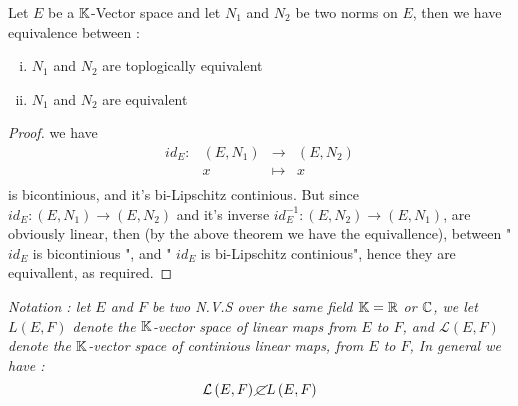 % 
% 

\lecday[2025-02-13]

% 

\begin{theorem}[]
Let $E$ be a $\mathbb{K}$-Vector space and let
$N_1$ and $N_2$ be two norms on $E$, then we have
equivalence between : 
\begin{enumerate}[(i)]
\item $N_1$ and $N_2$ are toplogically equivalent
\item $N_1$ and $N_2$ are equivalent 
\end{enumerate}
\end{theorem}
\begin{proof}
we have
\[
\begin{array}{cccc}
      id_{E} : &  \left( E,N_1 \right)  & \longrightarrow & 
      \left( E,N_2 \right)\\

           &  x  & \longmapsto     & x \\ 
\end{array}
\]
is bicontinious, and it's bi-Lipschitz continious. But
since $ id_{E} : \left( E,N_1 \right) \longrightarrow 
\left( E,N_2 \right)$ and it's inverse 
$ id_{E}^{-1} : \left( E,N_2 \right) \longrightarrow 
\left( E,N_1 \right)$, are obviously linear, then 
(by the above theorem we have the equivallence), 
between " $id_{E}$ is bicontinious ", and 
" $id_{E}$ is bi-Lipschitz continious", hence they are equivallent, 
as required.
\end{proof}
\it Notation : \normalfont let $E$ and $F$ be two N.V.S 
over the same field $\mathbb{K} = \mathbb{R} $ or $\mathbb{C} $, we let 
$L \left( E,F \right)$ denote the $\mathbb{K}$-vector space
of linear maps from $E$ to $F$, and $\mathcal{L} 
\left( E,F \right)$  denote the $\mathbb{K}$-vector space of continious linear
maps, from $E$ to $F$, In general we have : 
\[
	\mathcal{L} \left( E,F \right) \cancel{\subset}
L \left( E,F \right)
\]
